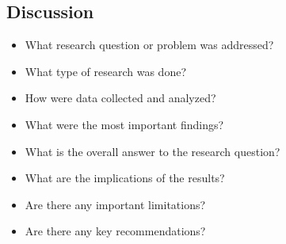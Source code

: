\subsection{Discussion}
\begin{itemize}
    \item What research question or problem was addressed?
    \item What type of research was done?
    \item How were data collected and analyzed?
    \item What were the most important findings?
    \item What is the overall answer to the research question?
    \item What are the implications of the results?
    \item Are there any important limitations?
    \item Are there any key recommendations?
\end{itemize}